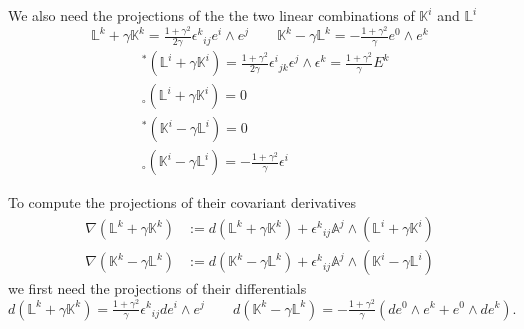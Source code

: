 \documentclass[a4paper, 11pt]{article}
\def\A{\mathbb{A}}
\def\L{\mathbb{L}}
\def\K{\mathbb{K}}
\def\ga{\gamma}
\def\ep{\epsilon}
\def\na{\nabla}
\def\we{\wedge}
\def\tp#1{{}^\ast\!#1}
\def\np#1{{}_\circ#1}
\numberwithin{equation}{section}
\begin{document}
We also need the projections of the the two linear combinations of $\K^i$ and $\L^i$ 
\[
    \L^k + \ga \K^k = \tfrac{1 + \ga^2}{2\ga} \ep^k{}_{ij} e^i \we e^j \qquad \K^k - \ga \L^k = - \tfrac{1 + \ga^2}{\ga} e^0 \we e^k
\]%
\begin{subequations}%
    \renewcommand{\theequation}{\theparentequation\alph{equation}}%
    \begin{align}
        & \tp(\L^i + \ga \K^i) = \tfrac{1 + \ga^2}{2\ga} \ep^i{}_{jk} \ep^j \we \ep^k = \tfrac{1 + \ga^2}\ga E^k \label{eq:LK_tangent}\\
        & \np(\L^i + \ga \K^i) =  0 \label{eq:LK_normal}\\ 
        &\tp(\K^i - \ga\L^i) = 0 \label{eq:KL_tangent}\\ 
        & \np(\K^i - \ga\L^i) = -\tfrac{1 + \ga^2}{\ga} \ep^i\label{eq:KL_normal}
        \end{align}
\end{subequations}


To compute the projections of their covariant derivatives
\begin{align*}
    \na \left(\L^k + \ga \K^k\right) &:= d\left(\L^k + \ga \K^k\right) + \ep^k{}_{ij} \A^j \we \left(\L^i + \ga \K^i\right) \\
    \na \left(\K^k - \ga \L^k\right) &:= d\left(\K^k - \ga \L^k\right) + \ep^k{}_{ij} \A^j \we \left(\K^i - \ga \L^i\right)
\end{align*}
we first need the projections of their differentials 
 \[
    d\left(\L^k + \ga \K^k\right) = \tfrac{1 + \ga^2}{\ga} \ep^k{}_{ij} de^i \we e^j \qquad d\left(\K^k - \ga \L^k\right) = - \tfrac{1 + \ga^2}{\ga} \left( de^0 \we e^k + e^0 \we de^k\right).
\]
\end{document}
